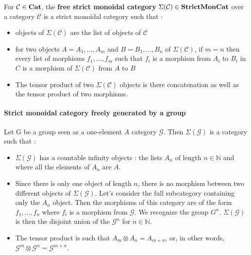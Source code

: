 \documentclass{report}
\begin{document}
\begin{defn}
    For $\mathcal{C} \in \bf Cat$, the \textbf{free strict monoidal category} $ \Sigma (\mathcal{C})\in \bf StrictMonCat$ over a category $\mathcal{C}$ is a strict monoidal category such that :
    \begin{itemize}
        \item objects of $\Sigma (\mathcal{C})$ are the list of objects of $\mathcal{C}$
        \item for two objects $A = A_1,\dots,A_m$ and $B = B_1,\dots,B_n$ of $\Sigma (\mathcal{C})$, if $m = n$ then every list of morphisms $f_1,\dots,f_m$ such that $f_i$ is a morphism from $A_i$ to $B_i$ in $C$ is a morphism of $\Sigma(\mathcal{C})$ from $A$ to $B$
        \item The tensor product of two $\Sigma(\mathcal{C})$ objects is there concatenation as well as the tensor product of two morphisms.
    \end{itemize}
\end{defn}

\paragraph{Strict monoidal category freely generated by a group}


Let G  be a group seen as a one-element $A$ category $\mathcal{G}$. Then $ \Sigma(\mathcal{G})$ is a category such that :
\begin{itemize}
    \item $\Sigma(\mathcal{G})$ has a countable infinity objects : the lists $A_n$ of length $n \in \mathbb{N}$ and where all the elements of $A_n$ are $A$.
    \item Since there is only one object of length $n$, there is no morphism between two different objects of $\Sigma(\mathcal{G})$. Let's consider the full subcategory containing only the $A_n$ object. Then the morphisms of this category are of the form $f_1,...,f_n$ where $f_i$ is a morphism from $\mathcal{G}$. We recognize the group $G^{n}$. $\Sigma (\mathcal{G})$ is then the disjoint union of the $\mathcal{G}^{n}$ for $ n\in\mathbb{N}$.
    \item  The tensor product is such that  $A_m \otimes A_n = A_{m+n}$, or, in other words, $\mathcal{G}^m \otimes \mathcal{G}^n = \mathcal{G}^{m+n}$.
\end{itemize}
\end{document}
